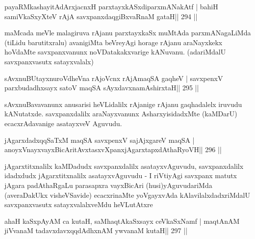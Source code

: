 
\begin{shl}
payaRMkashayitAdArxjacnxH parxtayxkASxdiparxmANakAtf |
bahiH samiVkaSxyXteV rAjA savxpanxdaqgiBxvaRnaM gataH\hfill || 294 ||
\end{shl}

\begin{artha}
maMcada meVle malagiruva rAjanu parxtayxkaSx muMtAda parxmANagaLiMda (tiLidu barutitxralu) avanigiMta beVreyAgi horage rAjanu araNayxkekx hoVdaMte savxpanxvanunx noVDatakakxvarige kANuvanu. (adariMdalU savxpanxvasutx satayxvalalx)
\end{artha}


\begin{shl}
sAvxnuBUtayxnuroVdheVna rAjoVcnx rAjA\s maqSA gaqheV |
savxpenxV parxbudadhxsayx satoV maqSA sAyxdavxnamAshirxtaH\hfill || 295 ||
\end{shl}

\begin{artha}
sAvxnuBavavanunx anusarisi heVLidalilx rAjanige rAjanu gaqhadalelx iruvudu kANutatxde. savxpanxdalilx araNayxvanunx AsharxyisidadxMte (kaMDarU) ecacxrAdavanige asatayxveV Aguvudu.
\end{artha}

\begin{shl}
jAgarxdadxqqSaTxM maqSA savxpenxV sajAjxgareV maqSA |
anoyxVnayxvayxBicAritAvxtasxvXpanxjAgarxtapxdAthaRyoVH\hfill || 296 ||
\end{shl}

\begin{artha}
jAgarxtitxnalilx kaMDadudx savxpanxdalilx asatayxvAguvudu, 
savxpanxdalilx idadxdudx jAgarxtitxnalilx asatayxvAguvudu - I riVtiyAgi savxpanx matutx jAgara padAthaRgaLu parasapxra vayxBicAri (husi)yAguvudariMda (averaDakUkx visheVSavide) ecacxrinaMte yoVgayxvAda kAlavilalxdadxriMdalU savxpanxvasutx satayxvalalxveMdu heVLutAtxre  \mdash 
\end{artha}

\begin{shl}
ahaH kaSxpAyAM ca kutaH, saMhaqtAkaSxsayx ceVkaSxNamf |
maqtAnAM jiVvanaM tadavxdavxqqdAdhxnAM ywvanaM kutaH\hfill || 297 ||
\end{shl}

